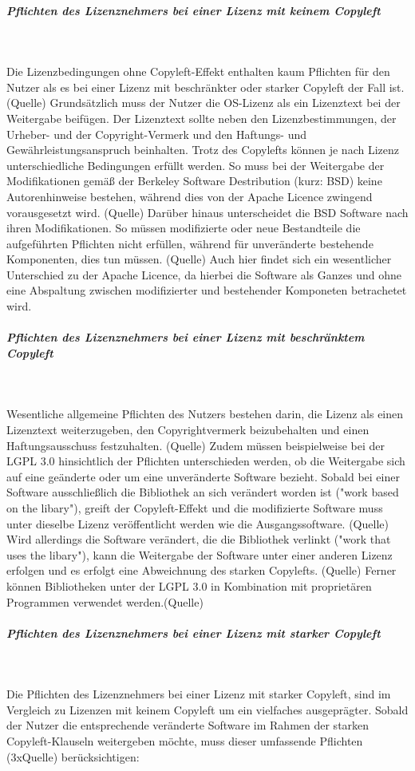 \subparagraph{Pflichten des Lizenznehmers bei einer Lizenz mit keinem Copyleft}$~$

Die Lizenzbedingungen ohne Copyleft-Effekt enthalten kaum Pflichten für den Nutzer als es bei einer Lizenz mit beschränkter oder starker Copyleft der Fall ist. (Quelle) Grundsätzlich muss der Nutzer die OS-Lizenz als ein Lizenztext bei der Weitergabe beifügen. Der Lizenztext sollte neben den Lizenzbestimmungen, der Urheber- und der Copyright-Vermerk und den Haftungs- und Gewährleistungsanspruch beinhalten. Trotz des Copylefts können je nach Lizenz unterschiedliche Bedingungen erfüllt werden. So muss bei der Weitergabe der Modifikationen gemäß der Berkeley Software Destribution (kurz: BSD) keine Autorenhinweise bestehen, während dies von der Apache Licence zwingend vorausgesetzt wird. (Quelle) Darüber hinaus unterscheidet die BSD Software nach ihren Modifikationen. So müssen modifizierte oder neue Bestandteile die aufgeführten Pflichten nicht erfüllen, während für unveränderte bestehende Komponenten, dies tun müssen. (Quelle) Auch hier findet sich ein wesentlicher Unterschied zu der Apache Licence, da hierbei die Software als Ganzes und ohne eine Abspaltung zwischen modifizierter und bestehender Komponeten betrachetet wird. 

\subparagraph{Pflichten des Lizenznehmers bei einer Lizenz mit beschränktem Copyleft}$~$

Wesentliche allgemeine Pflichten des Nutzers bestehen darin, die Lizenz als einen Lizenztext weiterzugeben, den Copyrightvermerk beizubehalten und einen Haftungsausschuss festzuhalten. (Quelle) Zudem müssen beispielweise bei der LGPL 3.0 hinsichtlich der Pflichten unterschieden werden, ob die Weitergabe sich auf eine geänderte oder um eine unveränderte Software bezieht. Sobald bei einer Software ausschließlich die Bibliothek an sich verändert worden ist ("work based on the libary"), greift der Copyleft-Effekt und die modifizierte Software muss unter dieselbe Lizenz veröffentlicht werden wie die Ausgangssoftware. (Quelle) Wird allerdings die Software verändert, die die Bibliothek verlinkt ("work that uses the libary"), kann die Weitergabe der Software unter einer anderen Lizenz erfolgen und es erfolgt eine Abweichnung des starken Copylefts. (Quelle) Ferner können Bibliotheken unter der LGPL 3.0 in Kombination mit proprietären Programmen verwendet werden.(Quelle) 

\subparagraph{Pflichten des Lizenznehmers bei einer Lizenz mit starker Copyleft}$~$

Die Pflichten des Lizenznehmers bei einer Lizenz mit starker Copyleft, sind im Vergleich zu Lizenzen mit keinem Copyleft um ein vielfaches ausgeprägter. Sobald der Nutzer die entsprechende veränderte Software im Rahmen der starken Copyleft-Klauseln weitergeben möchte, muss dieser umfassende Pflichten (3xQuelle) berücksichtigen: 

